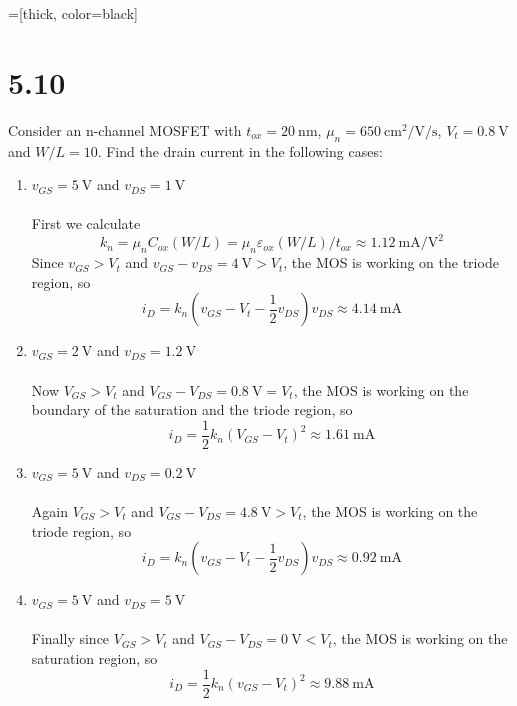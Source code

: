 \documentclass[12pt, a4paper]{article}
\title{} %
\author{} %
\date{} %
\begin{document}
=[thick, color=black]
\section{5.10}
Consider an n-channel MOSFET with $t_{ox} = \SI{20}\nm$, $\mu_{n} = \SI{650}{\cm\squared\per\V\per\s}$, $V_t = \SI{0.8}\V$ and $W/L = 10$. Find the drain current in the following cases:

\begin{enumerate}[label=(\alph*)]
  \item $v_{GS} = \SI{5}{\V}$ and $v_{DS} = \SI{1}{\V} $\\[5pt]
    \Ans \\
    First we calculate 
    \[ k_n = \mu_n C_{ox} (W / L) = \mu_n \varepsilon_{ox} (W / L) /  t_{ox} \approx \SI{1.12}{\mA\per\V\squared} \]
    Since $v_{GS} > V_t$ and $v_{GS} - v_{DS} = \SI{4}{\V} > V_t$, the MOS is working on the triode region, so 
    \[
      i_D =  k_n \left(v_{GS} - V_t - \frac{1}{2}v_{DS} \right)v_{DS} \approx \SI{4.14}{\mA} 
    \]
  \item $v_{GS} = \SI{2}{\V}$ and $v_{DS} = \SI{1.2}{\V} $\\[5pt]
    \Ans \\
    Now $V_{GS} > V_t$ and $V_{GS} - V_{DS} = \SI{0.8}{\V} = V_t$, the MOS is working on the boundary of the saturation and the triode region, so 
    \[
      i_D = \frac{1}{2} k_n (V_{GS} - V_t)^2 \approx \SI{1.61}{\mA} 
    \]
  \item $v_{GS} = \SI{5}{\V}$ and $v_{DS} = \SI{0.2}{\V} $\\[5pt]
    \Ans \\
    Again $V_{GS} > V_t$ and $V_{GS} - V_{DS} = \SI{4.8}{\V} > V_t$, the MOS is working on the triode region, so 
    \[
      i_D =  k_n \left(v_{GS} - V_t - \frac{1}{2}v_{DS} \right)v_{DS} \approx \SI{0.92}{\mA} 
    \]
  \item $v_{GS} = \SI{5}{\V}$ and $v_{DS} = \SI{5}{\V} $\\[5pt]
    \Ans \\
    Finally since $V_{GS} > V_t$ and $V_{GS} - V_{DS} = \SI{0}{\V} < V_t$, the MOS is working on the saturation region, so 
    \[
      i_D =  \frac{1}{2} k_n (v_{GS} - V_t)^2 \approx \SI{9.88}{\mA} 
    \]
\end{enumerate}
\end{document}
